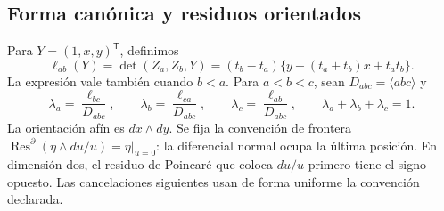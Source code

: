 \documentclass[a4paper,10pt]{article}
\theoremstyle{definition}\newtheorem{definition}[theorem]{Definición}
\theoremstyle{remark}\newtheorem{remark}[theorem]{Observación}
\numberwithin{equation}{section}
\begin{document}
\subsection{Forma canónica y residuos orientados}

Para \(Y=(1,x,y)^\mathsf T\), definimos
\begin{equation}
 \ell_{ab}(Y)=\det(Z_a,Z_b,Y)
 =(t_b-t_a)\{y-(t_a+t_b)x+t_at_b\}.
 \label{eq:polygon-lines}
\end{equation}
La expresión vale también cuando \(b<a\). Para \(a<b<c\), sean
\(D_{abc}=\langle abc\rangle\) y
\begin{equation}
 \lambda_a=\frac{\ell_{bc}}{D_{abc}},\qquad
 \lambda_b=\frac{\ell_{ca}}{D_{abc}},\qquad
 \lambda_c=\frac{\ell_{ab}}{D_{abc}},\qquad
 \lambda_a+\lambda_b+\lambda_c=1.
 \label{eq:polygon-barycentric}
\end{equation}
La orientación afín es \(dx\wedge dy\). Se fija la convención de frontera
\(\operatorname{Res}^{\partial}(\eta\wedge du/u)=\eta|_{u=0}\):
la diferencial normal ocupa la última posición. En dimensión dos, el
residuo de Poincaré que coloca \(du/u\) primero tiene el signo opuesto.
Las cancelaciones siguientes usan de forma uniforme la convención declarada.
\end{document}
